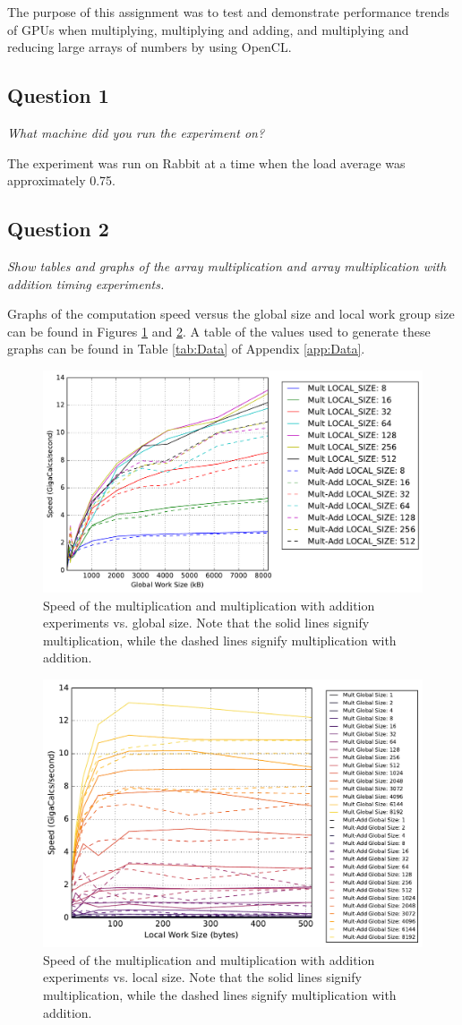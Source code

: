 \documentclass{article}
\begin{document}
The purpose of this assignment was to test and demonstrate performance trends of GPUs when multiplying, multiplying and adding, and multiplying and reducing large arrays of numbers by using OpenCL.

\subsection*{Question 1}
\textit{What machine did you run the experiment on?}

The experiment was run on Rabbit at a time when the load average was approximately 0.75.

\subsection*{Question 2}
\textit{Show tables and graphs of the array multiplication and array multiplication with addition timing experiments.}

Graphs of the computation speed versus the global size and local work group size can be found in Figures \ref{fig:MultGlobal} and \ref{fig:MultLocal}.  A table of the values used to generate these graphs can be found in Table \ref{tab:Data} of Appendix \ref{app:Data}.
\begin{figure}[h!]
	\centering
        \includegraphics[width=0.65\linewidth]{Mult_Arraysize_2.pdf}
        \caption{Speed of the multiplication and multiplication with addition experiments vs. global size.  Note that the solid lines signify multiplication, while the dashed lines signify multiplication with addition.}
        \label{fig:MultGlobal}
\end{figure}
\begin{figure}[h!]
	\centering
        \includegraphics[width=0.65\linewidth]{Mult_Localsize_2.pdf}
        \caption{Speed of the multiplication and multiplication with addition experiments vs. local size.  Note that the solid lines signify multiplication, while the dashed lines signify multiplication with addition.}
        \label{fig:MultLocal}
\end{figure}
\end{document}
